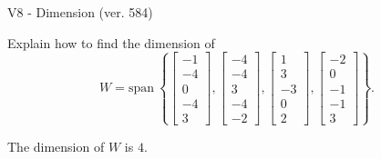 \begin{exercise}
  \begin{exerciseTitle}V8 - Dimension (ver. 584)\end{exerciseTitle}
  \begin{exerciseStatement}
    Explain how to find the dimension of 
\[W=\mathrm{span}\ \left\{\left[\begin{array}{r}
-1 \\
-4 \\
0 \\
-4 \\
3
\end{array}\right] , \left[\begin{array}{r}
-4 \\
-4 \\
3 \\
-4 \\
-2
\end{array}\right] , \left[\begin{array}{r}
1 \\
3 \\
-3 \\
0 \\
2
\end{array}\right] , \left[\begin{array}{r}
-2 \\
0 \\
-1 \\
-1 \\
3
\end{array}\right]\right\}.\]



  \end{exerciseStatement}
  \begin{exerciseAnswer}
   The dimension of \(W\) is  \(4\).
  


  \end{exerciseAnswer}
\end{exercise}